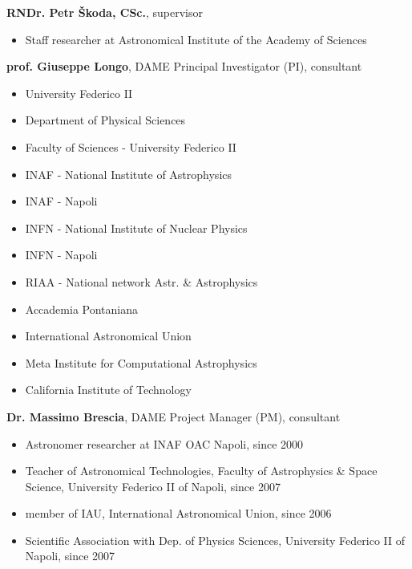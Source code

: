 \textbf{RNDr. Petr Škoda, CSc.}, supervisor 
\begin{itemize}
\item Staff researcher at Astronomical Institute of the Academy of Sciences
\end{itemize}


\bigskip
\noindent \textbf{prof. Giuseppe Longo}, DAME Principal Investigator
(PI), consultant
\setlength{\columnsep}{-15pt}
\begin{multicols}{2}
\begin{itemize} \addtolength{\itemsep}{-0.5\baselineskip}
\item University Federico II
\item Department of Physical Sciences
\item Faculty of Sciences - University Federico II
\item INAF - National Institute of Astrophysics
\item INAF - Napoli
\item INFN - National Institute of Nuclear Physics
\item INFN - Napoli
\item RIAA - National network Astr. \& Astrophysics
\item Accademia Pontaniana
\item International Astronomical Union
\item Meta Institute for Computational Astrophysics
\item California Institute of Technology
\end{itemize}
\end{multicols}
\bigskip

\noindent \textbf{Dr. Massimo Brescia}, DAME Project Manager (PM),
consultant

\begin{itemize}\addtolength{\itemsep}{-0.5\baselineskip}
\item Astronomer researcher at INAF OAC Napoli, since 2000
\item Teacher of Astronomical Technologies, Faculty of Astrophysics \& Space Science, University Federico II of Napoli, since 2007
\item member of IAU, International Astronomical Union, since 2006
\item Scientific Association with Dep. of Physics Sciences, University Federico II of Napoli, since 2007
\end{itemize}


